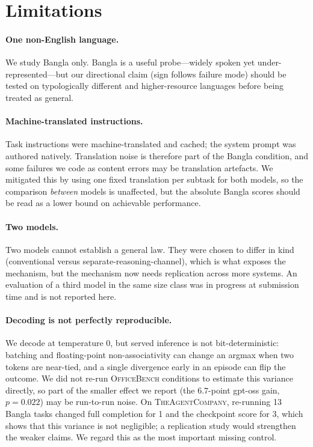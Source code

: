 \documentclass[11pt]{article}
\begin{document}
\section*{Limitations}

\paragraph{One non-English language.} We study Bangla only. Bangla is a useful probe---widely
spoken yet under-represented---but our directional claim (sign follows failure mode) should be
tested on typologically different and higher-resource languages before being treated as general.

\paragraph{Machine-translated instructions.} Task instructions were machine-translated and
cached; the system prompt was authored natively. Translation noise is therefore part of the
Bangla condition, and some failures we code as content errors may be translation artefacts. We
mitigated this by using one fixed translation per subtask for both models, so the comparison
\emph{between} models is unaffected, but the absolute Bangla scores should be read as a lower
bound on achievable performance.

\paragraph{Two models.} Two models cannot establish a general law. They were chosen to differ in
kind (conventional versus separate-reasoning-channel), which is what exposes the mechanism, but
the mechanism now needs replication across more systems. An evaluation of a third model in the
same size class was in progress at submission time and is not reported here.

\paragraph{Decoding is not perfectly reproducible.} We decode at temperature $0$, but served
inference is not bit-deterministic: batching and floating-point non-associativity can change an
argmax when two tokens are near-tied, and a single divergence early in an episode can flip the
outcome. We did not re-run \textsc{OfficeBench} conditions to estimate this variance directly,
so part of the smaller effect we report (the $6.7$-point gpt-oss gain, $p=0.022$) may be
run-to-run noise. On \textsc{TheAgentCompany}, re-running 13 Bangla tasks changed full
completion for 1 and the checkpoint score for 3, which shows that this variance is not
negligible; a replication study would strengthen the weaker claims. We regard this as the most important
missing control.
\end{document}
